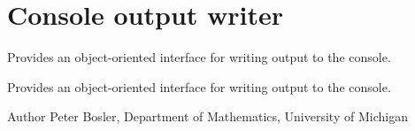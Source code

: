 \hypertarget{group___output_writer}{\section{Console output writer}
\label{group___output_writer}
}


Provides an object-\/oriented interface for writing output to the console.  


Provides an object-\/oriented interface for writing output to the console. 

\begin{DoxyAuthor}{Author}
Peter Bosler, Department of Mathematics, University of Michigan 
\end{DoxyAuthor}

